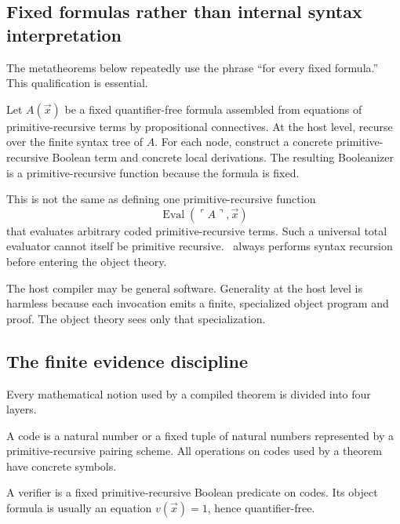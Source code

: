 \subsection{Fixed formulas rather than internal syntax interpretation}

The metatheorems below repeatedly use the phrase ``for every fixed formula.''  This qualification is essential.

Let \(A(\vec x)\) be a fixed quantifier-free formula assembled from equations of primitive-recursive terms by propositional connectives.  At the host level, recurse over the finite syntax tree of \(A\).  For each node, construct a concrete primitive-recursive Boolean term and concrete local derivations.  The resulting Booleanizer is a primitive-recursive function because the formula is fixed.

This is not the same as defining one primitive-recursive function
\[
  \operatorname{Eval}(\ulcorner A\urcorner,\vec x)
\]
that evaluates arbitrary coded primitive-recursive terms.  Such a universal total evaluator cannot itself be primitive recursive.  \CIFER\ always performs syntax recursion before entering the object theory.

\begin{remark}
The host compiler may be general software.  Generality at the host level is harmless because each invocation emits a finite, specialized object program and proof.  The object theory sees only that specialization.
\end{remark}

\subsection{The finite evidence discipline}

Every mathematical notion used by a compiled theorem is divided into four layers.

\begin{definition}[Code]
A code is a natural number or a fixed tuple of natural numbers represented by a primitive-recursive pairing scheme.  All operations on codes used by a theorem have concrete  symbols.
\end{definition}

\begin{definition}[Verifier]
A verifier is a fixed primitive-recursive Boolean predicate on codes.  Its object formula is usually an equation \(v(\vec x)=1\), hence quantifier-free.
\end{definition}

